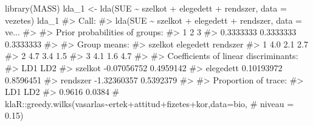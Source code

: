 \documentclass[
  letterpaper,
]{krantz}
\makeatletter
\newenvironment{Shaded}{\begin{snugshade}}{\end{snugshade}}
\newcommand{\AttributeTok}[1]{\textcolor[rgb]{0.40,0.45,0.13}{#1}}
\newcommand{\CommentTok}[1]{\textcolor[rgb]{0.37,0.37,0.37}{#1}}
\newcommand{\DecValTok}[1]{\textcolor[rgb]{0.68,0.00,0.00}{#1}}
\newcommand{\FunctionTok}[1]{\textcolor[rgb]{0.28,0.35,0.67}{#1}}
\newcommand{\NormalTok}[1]{\textcolor[rgb]{0.00,0.23,0.31}{#1}}
\newcommand{\OtherTok}[1]{\textcolor[rgb]{0.00,0.23,0.31}{#1}}
\newcommand{\SpecialCharTok}[1]{\textcolor[rgb]{0.37,0.37,0.37}{#1}}
\newcommand{\StringTok}[1]{\textcolor[rgb]{0.13,0.47,0.30}{#1}}
\newenvironment{kframe}{%
\medskip{}
\setlength{\fboxsep}{.8em}
 \def\at@end@of@kframe{}%
 \ifinner\ifhmode%
  \def\at@end@of@kframe{\end{minipage}}%
  \begin{minipage}{\columnwidth}%
 \fi\fi%
 \def\FrameCommand##1{\hskip\@totalleftmargin \hskip-\fboxsep
 \colorbox{shadecolor}{##1}\hskip-\fboxsep
     \hskip-\linewidth \hskip-\@totalleftmargin \hskip\columnwidth}%
 \MakeFramed {\advance\hsize-\width
   \@totalleftmargin\z@ \linewidth\hsize
   \@setminipage}}%
 {\par\unskip\endMakeFramed%
 \at@end@of@kframe}
\renewenvironment{Shaded}{\begin{kframe}}{\end{kframe}}
\makeatother
\begin{document}
\begin{Shaded}
\begin{Highlighting}[]
\FunctionTok{library}\NormalTok{(MASS)}
\NormalTok{lda\_1 }\OtherTok{\textless{}{-}} \FunctionTok{lda}\NormalTok{(SUE }\SpecialCharTok{\textasciitilde{}}\NormalTok{ szelkot }\SpecialCharTok{+}\NormalTok{ elegedett }\SpecialCharTok{+}\NormalTok{ rendszer, }\AttributeTok{data =}\NormalTok{ vezetes)}
\NormalTok{lda\_1}
\CommentTok{\#\textgreater{} Call:}
\CommentTok{\#\textgreater{} lda(SUE \textasciitilde{} szelkot + elegedett + rendszer, data = ve...}
\CommentTok{\#\textgreater{} }
\CommentTok{\#\textgreater{} Prior probabilities of groups:}
\CommentTok{\#\textgreater{}         1         2         3 }
\CommentTok{\#\textgreater{} 0.3333333 0.3333333 0.3333333 }
\CommentTok{\#\textgreater{} }
\CommentTok{\#\textgreater{} Group means:}
\CommentTok{\#\textgreater{}   szelkot elegedett rendszer}
\CommentTok{\#\textgreater{} 1     4.0       2.1      2.7}
\CommentTok{\#\textgreater{} 2     4.7       3.4      1.5}
\CommentTok{\#\textgreater{} 3     4.1       1.6      4.7}
\CommentTok{\#\textgreater{} }
\CommentTok{\#\textgreater{} Coefficients of linear discriminants:}
\CommentTok{\#\textgreater{}                   LD1       LD2}
\CommentTok{\#\textgreater{} szelkot   {-}0.07056752 0.4959142}
\CommentTok{\#\textgreater{} elegedett  0.10193972 0.8596451}
\CommentTok{\#\textgreater{} rendszer  {-}1.32360357 0.5392379}
\CommentTok{\#\textgreater{} }
\CommentTok{\#\textgreater{} Proportion of trace:}
\CommentTok{\#\textgreater{}    LD1    LD2 }
\CommentTok{\#\textgreater{} 0.9616 0.0384}
\CommentTok{\# klaR::greedy.wilks(vasarlas\textasciitilde{}ertek+attitud+fizetes+kor,data=bio,}
\CommentTok{\# niveau = 0.15)}
\end{Highlighting}
\end{Shaded}

\begin{Shaded}
\end{Shaded}
\end{document}
